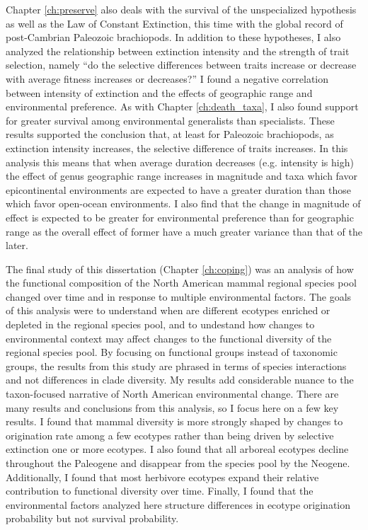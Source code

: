 Chapter \ref{ch:preserve} also deals with the survival of the unspecialized hypothesis as well as the Law of Constant Extinction, this time with the global record of post-Cambrian Paleozoic brachiopods. In addition to these hypotheses, I also analyzed the relationship between extinction intensity and the strength of trait selection, namely ``do the selective differences between traits increase or decrease with average fitness increases or decreases?'' I found a negative correlation between intensity of extinction and the effects of geographic range and environmental preference. As with Chapter \ref{ch:death_taxa}, I also found support for greater survival among environmental generalists than specialists. These results supported the conclusion that, at least for Paleozoic brachiopods, as extinction intensity increases, the selective difference of traits increases. In this analysis this means that when average duration decreases (e.g. intensity is high) the effect of genus geographic range increases in magnitude and taxa which favor epicontinental environments are expected to have a greater duration than those which favor open-ocean environments. I also find that the change in magnitude of effect is expected to be greater for environmental preference than for geographic range as the overall effect of former have a much greater variance than that of the later.

The final study of this dissertation (Chapter \ref{ch:coping}) was an analysis of how the functional composition of the North American mammal regional species pool changed over time and in response to multiple environmental factors. The goals of this analysis were to understand when are different ecotypes enriched or depleted in the regional species pool, and to undestand how changes to environmental context may affect changes to the functional diversity of the regional species pool. By focusing on functional groups instead of taxonomic groups, the results from this study are phrased in terms of species interactions and not differences in clade diversity. My results add considerable nuance to the taxon-focused narrative of North American environmental change. There are many results and conclusions from this analysis, so I focus here on a few key results. I found that mammal diversity is more strongly shaped by changes to origination rate among a few ecotypes rather than being driven by selective extinction one or more ecotypes. I also found that all arboreal ecotypes decline throughout the Paleogene and disappear from the species pool by the Neogene. Additionally, I found that most herbivore ecotypes expand their relative contribution to functional diversity over time. Finally, I found that the environmental factors analyzed here structure differences in ecotype origination probability but not survival probability.


